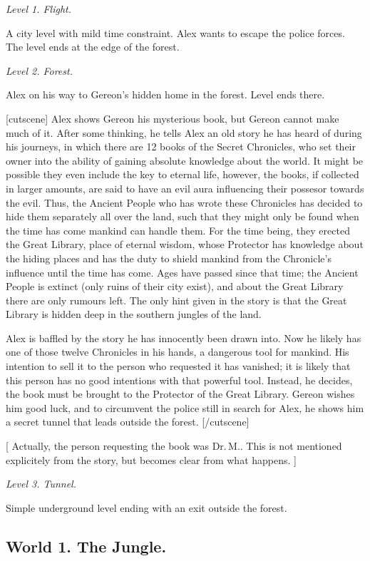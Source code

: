 \documentclass{gd-document}
\newcommand\DrM{Dr.\,M.\xspace}
\newcommand\level[1]{\textit{#1}}
\begin{document}
\level{Level 1. Flight.}

A city level with mild time constraint. Alex wants to escape the
police forces. The level ends at the edge of the forest.

\level{Level 2. Forest.}

Alex on his way to Gereon’s hidden home in the forest. Level ends
there.

[cutscene]
Alex shows Gereon his mysterious book, but Gereon cannot make much of
it. After some thinking, he tells Alex an old story he has heard of
during his journeys, in which there are 12 books of the Secret
Chronicles, who set their owner into the ability of gaining absolute
knowledge about the world. It might be possible they even include the
key to eternal life, however, the books, if collected in larger
amounts, are said to have an evil aura influencing their possesor
towards the evil. Thus, the Ancient People who has wrote these
Chronicles has decided to hide them separately all over the land,
such that they might only be found when the time has come mankind can
handle them. For the time being, they erected the Great Library, place
of eternal wisdom, whose Protector has knowledge about the hiding
places and has the duty to shield mankind from the Chronicle’s
influence until the time has come. Ages have passed since that time;
the Ancient People is extinct (only ruins of their city exist), and
about the Great Library there are only rumours left. The only hint
given in the story is that the Great Library is hidden deep in the
southern jungles of the land.

Alex is baffled by the story he has innocently been drawn into. Now
he likely has one of those twelve Chronicles in his hands, a dangerous
tool for mankind. His intention to sell it to the person who requested
it has vanished; it is likely that this person has no good intentions
with that powerful tool. Instead, he decides, the book must be brought
to the Protector of the Great Library. Gereon wishes him good luck,
and to circumvent the police still in search for Alex, he shows him a
secret tunnel that leads outside the forest.
[/cutscene]

[ Actually, the person requesting the book was \DrM. This is not
mentioned explicitely from the story, but becomes clear from what
happens. ]

\level{Level 3. Tunnel.}

Simple underground level ending with an exit outside the forest.

\subsection{World 1. The Jungle.}
\end{document}
